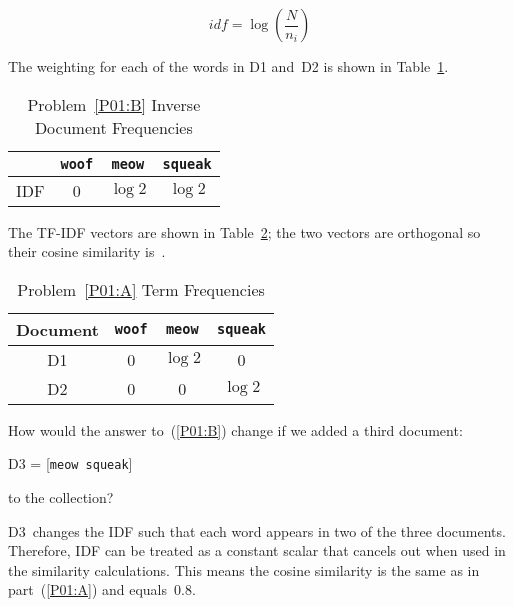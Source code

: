 \begin{equation}\label{eq:P01:IDF}
  idf = \log \left( \frac{N}{n_i} \right)
\end{equation}

\noindent
The weighting for each of the words in D1 and~D2 is shown in Table~\ref{tab:P01:IDF}.

  \begin{table}[h]
    \centering
    \caption{Problem~\ref{P01:B} Inverse Document Frequencies}\label{tab:P01:IDF}
    \begin{tabular}{|c|c|c|c|}
      \hline
          & \texttt{woof} & \texttt{meow}  & \texttt{squeak} \\\hline\hline
      IDF & 0             & $\log 2$       & $\log 2$ \\\hline
    \end{tabular}
  \end{table}

\noindent
The TF-IDF vectors are shown in Table~\ref{tab:P01:TFIDF}; the two vectors are orthogonal so their cosine similarity is~.

  \begin{table}[h]
    \centering
    \caption{Problem~\ref{P01:A} Term Frequencies}\label{tab:P01:TFIDF}
    \begin{tabular}{|c|c|c|c|}
      \hline
      \textbf{Document} & \texttt{woof} & \texttt{meow} & \texttt{squeak} \\\hline\hline
      D1                & 0             & $\log 2$      & 0 \\\hline
      D2                & 0             & 0             & $\log 2$ \\\hline
    \end{tabular}
  \end{table}

\begin{subproblem}\label{P01:C}
   How would the answer to~(\ref{P01:B}) change if we added a third document:

  D3 = [\texttt{meow squeak}]

  \noindent
  to the collection?
\end{subproblem}

D3~changes the IDF such that each word appears in two of the three documents.  Therefore, IDF can be treated as a constant scalar that cancels out when used in the similarity calculations.  This means the cosine similarity is the same as in part~(\ref{P01:A}) and equals~$\boxed{0.8}$.
